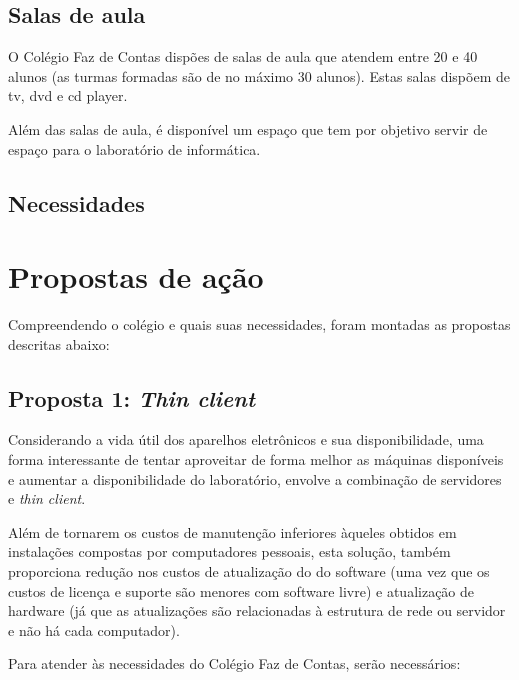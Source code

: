 \documentclass[a4paper,12pt]{report}
\begin{document}
            \subsection{Salas de aula}
            O Colégio Faz de Contas dispões de salas de aula que atendem entre
            20 e 40 alunos (as turmas formadas são de no máximo 30 alunos).
            Estas salas dispõem de tv, dvd e cd player.

            Além das salas de aula, é disponível um espaço que tem por
            objetivo servir de espaço para o laboratório de informática.

            \subsection{Necessidades}

        \section{Propostas de ação}
        \label{sc:laboratorio_proposta}
        Compreendendo o colégio e quais suas necessidades, foram montadas
        as propostas descritas abaixo:

            \subsection{Proposta 1: \emph{Thin client}}
            Considerando a vida útil dos aparelhos eletrônicos e sua
            disponibilidade, uma forma interessante de tentar aproveitar de
            forma melhor as máquinas disponíveis e aumentar a disponibilidade
            do laboratório, envolve a combinação de servidores e \emph{thin
            client}.

            Além de tornarem os custos de manutenção inferiores àqueles
            obtidos em instalações compostas por computadores pessoais, esta
            solução, também proporciona redução nos custos de atualização do
            do software (uma vez que os custos de licença e suporte são
            menores com software livre) e atualização de hardware (já que as
            atualizações são relacionadas à estrutura de rede ou servidor e não
            há cada computador).

            Para atender às necessidades do Colégio Faz de Contas, serão
            necessários:
\end{document}
